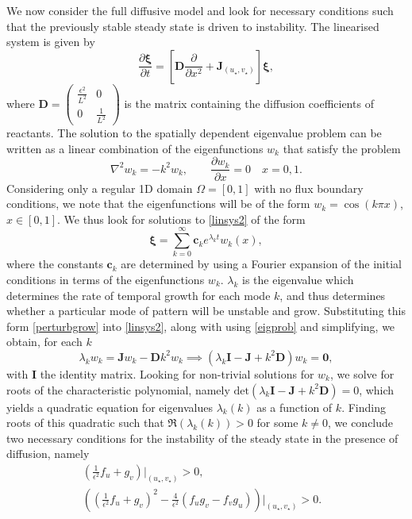 We now consider the full diffusive model and look for necessary conditions such that the previously stable steady state is driven to instability. The linearised system is given by
\begin{equation}\label{linsys2}
    \frac{\partial \pmb{\xi}}{\partial t}=\left[\textbf{D}\frac{\partial}{\partial x^2}+\textbf{J}_{(u_\star,v_\star)} \right]\pmb{\xi},
\end{equation}
where $\textbf{D}=\begin{pmatrix}\frac{\epsilon^2}{L^2}&0\\0&\frac{1}{L^2}\end{pmatrix}$ is the matrix containing the diffusion coefficients of reactants. The solution to the spatially dependent eigenvalue problem can be written as a linear combination of the eigenfunctions $w_k$ that satisfy the problem
\begin{equation}\label{eigprob}
\nabla^2w_k=-k^2w_k,\quad \quad \frac{\partial w_k}{\partial x}=0\quad x=0, 1.
\end{equation}
Considering only a regular 1D domain $\Omega=[0,1]$ with no flux boundary conditions, we note that the eigenfunctions will be of the form $w_k=\cos(k\pi x)$, $x\in[0,1]$. We thus look for solutions to \eqref{linsys2} of the form
\begin{equation}\label{perturbgrow}
    \pmb{\xi}=\sum_{k=0}^{\infty} \textbf{c}_ke^{\lambda_k t}w_k(x),
\end{equation}
where the constants $\textbf{c}_k$ are determined by using a Fourier expansion of the initial conditions in terms of the eigenfunctions $w_k$. $\lambda_k$ is the eigenvalue which determines the rate of temporal growth for each mode $k$, and thus determines whether a particular mode of pattern will be unstable and grow. Substituting this form \eqref{perturbgrow} into \eqref{linsys2}, along with using \eqref{eigprob} and simplifying, we obtain, for each $k$
$$
\lambda_k w_k=\textbf{J}w_k-\textbf{D}k^2w_k \implies (\lambda_k \textbf{I}-\textbf{J}+k^2\textbf{D})w_k=\textbf{0},
$$
with $\textbf{I}$ the identity matrix. Looking for non-trivial solutions for $w_k$, we solve for roots of the characteristic polynomial, namely $\text{det}(\lambda_k \textbf{I}-\textbf{J}+k^2\textbf{D})=0$, which yields a quadratic equation for eigenvalues $\lambda_k(k)$ as a function of $k$. Finding roots of this quadratic such that $\Re(\lambda_k(k))>0$ for some $k\neq0$, we conclude \cite{murray} two necessary conditions for the instability of the steady state in the presence of diffusion, namely
\begin{equation}\label{cond2}
    \begin{split}
    \left(\frac{1}{\epsilon^2}f_u+g_v\right)\bigg|_{(u_\star,v_\star)}>0,&\\
    \left(\left(\frac{1}{\epsilon^2}f_u+g_v\right)^2-\frac{4}{\epsilon^2}(f_ug_v-f_vg_u)\right)\bigg|_{(u_\star,v_\star)}>0.
\end{split}
\end{equation}
